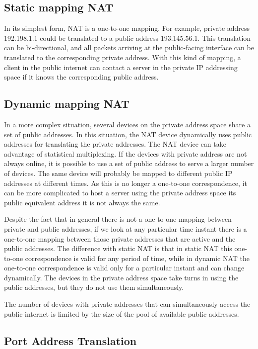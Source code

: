\subsection{Static mapping NAT}
In its simplest form, NAT is a one-to-one mapping.
For example, private address 192.198.1.1 could be translated to a public address 193.145.56.1.
This translation can be bi-directional, and all packets arriving at the public-facing interface can be translated to the corresponding private address.
With this kind of mapping, a client in the public internet can contact a server in the private IP addressing space if it knows the corresponding public address.

\subsection{Dynamic mapping NAT}
In a more complex situation, several devices on the private address space share a set of public addresses.
In this situation, the NAT device dynamically uses public addresses for translating the private addresses.
The NAT device can take advantage of statistical multiplexing.
If the devices with private address are not always online, it is possible to use a set of public address to serve a larger number of devices.
The same device will probably be mapped to different public IP addresses at different times.
As this is no longer a one-to-one correspondence, it can be more complicated to host a server using the private address space its public equivalent address it is not always the same.


Despite the fact that in general there is not a one-to-one mapping between private and public addresses, if we look at any particular time instant there is a one-to-one mapping between those private addresses that are active and the public addresses.
The difference with static NAT is that in static NAT this one-to-one correspondence is valid for any period of time, while in dynamic NAT the one-to-one correspondence is valid only for a particular instant and can change dynamically.
The devices in the private address space take turns in using the public addresses, but they do not use them simultaneously.

The number of devices with private addresses that can simultaneously access the public internet is limited by the size of the pool of available public addresses.

\subsection{Port Address Translation}

